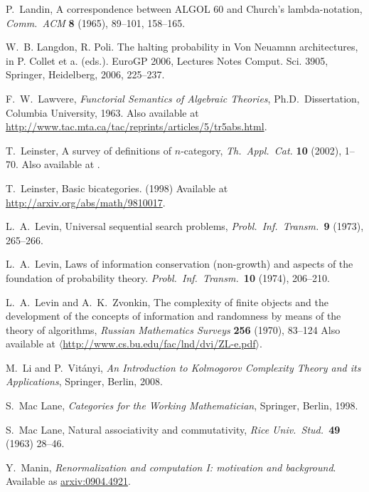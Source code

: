 \documentclass[12pt,twoside,openright]{report}
\begin{document}
\begin{thebibliography}{99}
 P.\ Landin, A correspondence between ALGOL 60 and Church's lambda-notation, {\sl Comm.\ ACM} {\bf 8} (1965), 89--101,
158--165.

 W.~B. Langdon, R. Poli. The halting probability in Von Neuamnn architectures, in P. Collet et a. (eds.). EuroGP 2006, Lectures Notes Comput. Sci. 3905, Springer, Heidelberg, 2006, 225--237.

 F.\ W.\ Lawvere, {\sl Functorial Semantics of Algebraic Theories}, Ph.D.\ Dissertation, Columbia University, 1963. Also available at 
\href{http://www.tac.mta.ca/tac/reprints/articles/5/tr5abs.html}
{http://www.tac.mta.ca/tac/reprints/articles/5/tr5abs.html}.

T.\ Leinster, A survey of definitions of $n$-category,
\textsl{Th.\ Appl.\ Cat.} \textbf{10} (2002), 1--70. Also available at .

 T.\ Leinster, Basic bicategories. (1998)  Available at \href{http://arxiv.org/abs/math/9810017}{http://arxiv.org/abs/math/9810017}.

 L.\ A.\ Levin, Universal sequential search problems, \textit{Probl.\ Inf.\ Transm.\ }\textbf{9}
(1973), 265--266.

 L.\ A.\ Levin, Laws of information conservation
(non-growth) and aspects of the foundation of probability theory.
\textit{Probl.\ Inf.\ Transm.\ }\textbf{10} (1974),
206--210.

 L.\ A.\ Levin and A.\ K.\ Zvonkin, The complexity of finite objects and the development of the concepts of information and randomness by means of the theory of algorithms, 
\textsl{Russian Mathematics Surveys} {\bf 256} (1970), 83--124
Also available at \href{http://www.cs.bu.edu/fac/lnd/dvi/ZL-e.pdf}
{$\langle$http://www.cs.bu.edu/fac/lnd/dvi/ZL-e.pdf$\rangle$}.

 M.\ Li and P.\ Vit\'anyi, \textsl{An Introduction to Kolmogorov Complexity Theory and its Applications}, Springer, Berlin, 2008.

 S.\ Mac Lane, {\sl Categories for the Working Mathematician}, Springer, Berlin, 1998.

 S.\ Mac Lane, Natural associativity and commutativity, {\sl Rice Univ.\ Stud.\ }{\bf 49} (1963) 28--46.

 Y.\ Manin, \textsl{Renormalization and computation I: motivation and background}.  Available as
\href{http://arxiv.org/abs/0904.4921}{arxiv:0904.4921}.


\end{thebibliography}
\end{document}
